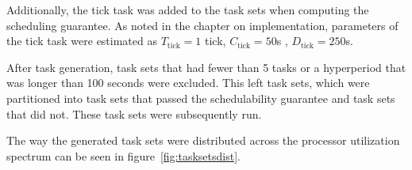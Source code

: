 \noindent Additionally, the \ucos tick task was added to the task sets when computing the scheduling guarantee. As noted in the chapter on implementation, parameters of the tick task were estimated as $T_{\text{tick}} = 1$ tick, $C_\text{tick} = 50$\textmu s , $D_\text{tick} = 250$\textmu s.

After task generation, task sets that had fewer than 5 tasks or a hyperperiod that was longer than 100 seconds were excluded. This left \totalsets{} task sets, which were partitioned into \totalsuccess{} task sets that passed the schedulability guarantee and \totalfailure{} task sets that did not. These task sets were subsequently run.

The way the generated task sets were distributed across the processor utilization spectrum can be seen in figure~\ref{fig:tasksetsdist}.

